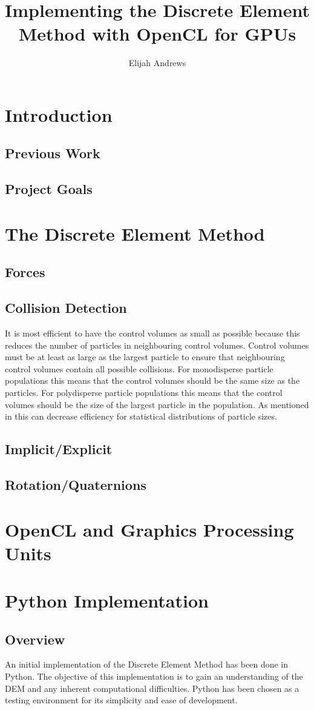 \documentclass[10pt,a4paper,titlepage]{report}
\author{Elijah Andrews}
\title{Implementing the Discrete Element Method with OpenCL for GPUs}
\begin{document}
\tableofcontents
\chapter{Introduction}
\section{Previous Work}
\section{Project Goals}
\chapter{The Discrete Element Method}
\section{Forces}
\section{Collision Detection}
It is most efficient to have the control volumes as small as possible because this reduces the number of particles in neighbouring control volumes. Control volumes must be at least as large as the largest particle to ensure that neighbouring control volumes contain all possible collisions. For monodisperse particle populations this means that the control volumes should be the same size as the particles. For polydisperse particle populations this means that the control volumes should be the size of the largest particle in the population. As mentioned in %
this can decrease efficiency for statistical distributions of particle sizes.
\section{Implicit/Explicit}
\section{Rotation/Quaternions}
\chapter{OpenCL and Graphics Processing Units}
\chapter{Python Implementation}
\section{Overview}
An initial implementation of the Discrete Element Method has been done in Python. The objective of this implementation is to gain an understanding of the DEM and any inherent computational difficulties. Python has been chosen as a testing environment for its simplicity and ease of development. 
\end{document}
